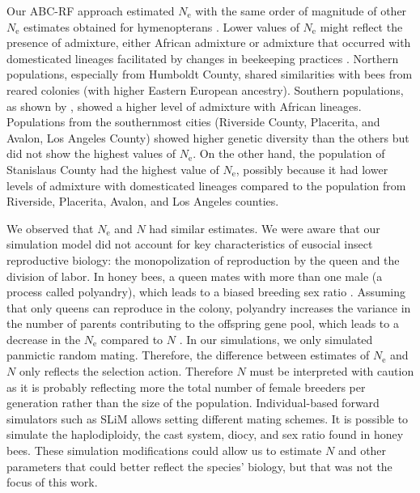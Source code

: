 \documentclass[a4paper, 12pt]{article}
\begin{document}
Our ABC-RF approach estimated $N_\mathrm{e}$ with the same order of magnitude of other $N_\mathrm{e}$ estimates obtained for hymenopterans \citep{Zayed:2004kg}.
Lower values of $N_\mathrm{e}$ might reflect the presence of admixture, either African admixture or admixture that occurred with domesticated lineages facilitated by changes in beekeeping practices \citep{Cridland:2018fx}. Northern populations, especially from Humboldt County, shared similarities with bees from reared colonies (with higher Eastern European ancestry). Southern populations, as shown by \citet{Cridland:2018fx}, showed a higher level of admixture with African lineages. Populations from the southernmost cities (Riverside County, Placerita, and Avalon, Los Angeles County) showed higher genetic diversity than the others but did not show the highest values of $N_\mathrm{e}$. On the other hand, the population of Stanislaus County had the highest value of $N_\mathrm{e}$, possibly because it had lower levels of admixture with domesticated lineages compared to the population from Riverside, Placerita, Avalon, and Los Angeles counties.
 
We observed that $N_\mathrm{e}$ and $N$ had similar estimates. We were aware that our simulation model did not account for key characteristics of eusocial insect reproductive biology: the monopolization of reproduction by the queen and the division of labor. In honey bees, a queen mates with more than one male (a process called polyandry), which leads to a biased breeding sex ratio \citep{Estoup:jj}. Assuming that only queens can reproduce in the colony, polyandry increases the variance in the number of parents contributing to the offspring gene pool, which leads to a decrease in the $N_\mathrm{e}$ compared to $N$ \citep{Nomura:2012bp}. In our simulations, we only simulated panmictic random mating. Therefore, the difference between estimates of $N_\mathrm{e}$ and $N$ only reflects the selection action. Therefore $N$ must be interpreted with caution as it is probably reflecting more the total number of female breeders per generation rather than the size of the population. Individual-based forward simulators such as SLiM allows setting different mating schemes. It is possible to simulate the haplodiploidy, the cast system, diocy, and sex ratio found in honey bees. These simulation modifications could allow us to estimate $N$ and other parameters that could better reflect the species' biology, but that was not the focus of this work.
\end{document}
